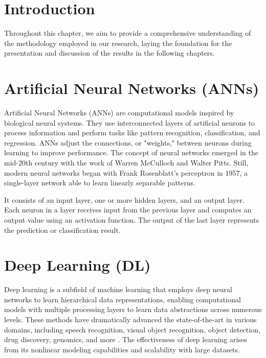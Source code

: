 \section{Introduction}

Throughout this chapter, we aim to provide a comprehensive understanding of the methodology employed in our research, laying the foundation for the presentation and discussion of the results in the following chapters.

\section{Artificial Neural Networks (ANNs)}
Artificial Neural Networks (ANNs) are computational models inspired by biological neural systems. They use interconnected layers of artificial neurons to process information and perform tasks like pattern recognition, classification, and regression. ANNs adjust the connections, or "weights," between neurons during learning to improve performance. The concept of neural networks emerged in the mid-20th century with the work of Warren McCulloch and Walter Pitts. Still, modern neural networks began with Frank Rosenblatt's perceptron in 1957, a single-layer network able to learn linearly separable patterns.





It consists of an input layer, one or more hidden layers, and an output layer. Each neuron in a layer receives input from the previous layer and computes an output value using an activation function. The output of the last layer represents the prediction or classification result.





\section{Deep Learning (DL)}


Deep learning is a subfield of machine learning that employs deep neural networks to learn hierarchical data representations, enabling computational models with multiple processing layers to learn data abstractions across numerous levels. These methods have dramatically advanced the state-of-the-art in various domains, including speech recognition, visual object recognition, object detection, drug discovery, genomics, and more \cite{LeCun2015DeepLearning}. The effectiveness of deep learning arises from its nonlinear modeling capabilities and scalability with large datasets.

